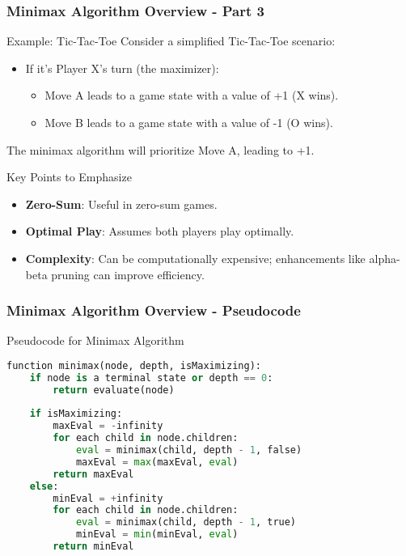 \documentclass[aspectratio=169]{beamer}
\begin{document}
\begin{frame}[fragile]
    \frametitle{Minimax Algorithm Overview - Part 3}
    \begin{block}{Example: Tic-Tac-Toe}
        Consider a simplified Tic-Tac-Toe scenario:
        \begin{itemize}
            \item If it’s Player X's turn (the maximizer):
                \begin{itemize}
                    \item Move A leads to a game state with a value of +1 (X wins).
                    \item Move B leads to a game state with a value of -1 (O wins).
                \end{itemize}
        \end{itemize}
        The minimax algorithm will prioritize Move A, leading to +1.
    \end{block}
    
    \begin{block}{Key Points to Emphasize}
        \begin{itemize}
            \item \textbf{Zero-Sum}: Useful in zero-sum games.
            \item \textbf{Optimal Play}: Assumes both players play optimally.
            \item \textbf{Complexity}: Can be computationally expensive; enhancements like alpha-beta pruning can improve efficiency.
        \end{itemize}
    \end{block}
\end{frame}

\begin{frame}[fragile]
    \frametitle{Minimax Algorithm Overview - Pseudocode}
    \begin{block}{Pseudocode for Minimax Algorithm}
    \begin{lstlisting}[language=Python]
function minimax(node, depth, isMaximizing):
    if node is a terminal state or depth == 0:
        return evaluate(node)
    
    if isMaximizing:
        maxEval = -infinity
        for each child in node.children:
            eval = minimax(child, depth - 1, false)
            maxEval = max(maxEval, eval)
        return maxEval
    else:
        minEval = +infinity
        for each child in node.children:
            eval = minimax(child, depth - 1, true)
            minEval = min(minEval, eval)
        return minEval
    \end{lstlisting}
    \end{block}
\end{frame}
\end{document}
